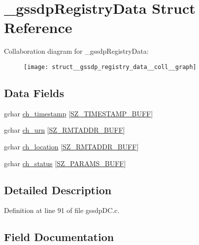 \hypertarget{struct__gssdp_registry_data}{}\section{\+\_\+gssdp\+Registry\+Data Struct Reference}
\label{struct__gssdp_registry_data}


Collaboration diagram for \+\_\+gssdp\+Registry\+Data\+:\nopagebreak
\begin{figure}[H]
\begin{center}
\leavevmode
\texttt{[image: struct\_\_gssdp\_registry\_data\_\_coll\_\_graph]}
\end{center}
\end{figure}
\subsection*{Data Fields}
\begin{DoxyCompactItemize}
\item 
gchar \hyperlink{struct__gssdp_registry_data_a97c1fccf55465d4de2168be0d70e2707}{ch\+\_\+timestamp} \mbox{[}\hyperlink{gtk_d_s_8c_ac08ad1b127f1c9743c5592ffb796423f}{S\+Z\+\_\+\+T\+I\+M\+E\+S\+T\+A\+M\+P\+\_\+\+B\+U\+FF}\mbox{]}
\item 
gchar \hyperlink{struct__gssdp_registry_data_a57a14b78092cbef8cf6dfa56cffa03db}{ch\+\_\+urn} \mbox{[}\hyperlink{gtk_d_s_8c_a152ca8fa1a2eac39d1badafb6c6cef8c}{S\+Z\+\_\+\+R\+M\+T\+A\+D\+D\+R\+\_\+\+B\+U\+FF}\mbox{]}
\item 
gchar \hyperlink{struct__gssdp_registry_data_ac1ca256d22c387e9ef968fb8413d7796}{ch\+\_\+location} \mbox{[}\hyperlink{gtk_d_s_8c_a152ca8fa1a2eac39d1badafb6c6cef8c}{S\+Z\+\_\+\+R\+M\+T\+A\+D\+D\+R\+\_\+\+B\+U\+FF}\mbox{]}
\item 
gchar \hyperlink{struct__gssdp_registry_data_a92d851353d8779ad1c5dd4e540a956e5}{ch\+\_\+status} \mbox{[}\hyperlink{gtk_d_s_8c_ac21e8a77d073e7a5383c92bb485992c8}{S\+Z\+\_\+\+P\+A\+R\+A\+M\+S\+\_\+\+B\+U\+FF}\mbox{]}
\end{DoxyCompactItemize}


\subsection{Detailed Description}


Definition at line 91 of file gssdp\+D\+C.\+c.



\subsection{Field Documentation}
